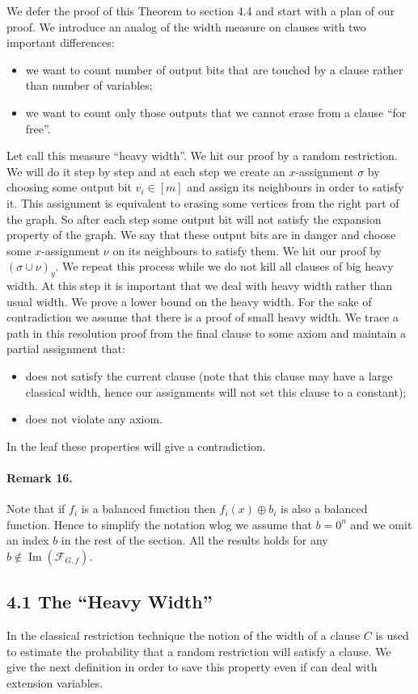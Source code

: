 \documentclass[10pt,a4paper]{article}
\begin{document}
We defer the proof of this Theorem to section 4.4 and start with a plan of our proof.
We introduce an analog of the width measure on clauses with two important differences:
\begin{itemize}
\item we want to count number of output bits that are touched by a clause rather than number of variables;
\item we want to count only those outputs that we cannot erase from a clause ``for free''.
\end{itemize}
Let call this measure ``heavy width''.
We hit our proof by a random restriction. We will do it step by step and at each step we create an $x$-assignment $\sigma$ by choosing some output bit $v_i\in[m]$ and assign its neighbours in order to satisfy it. This assignment is equivalent to erasing some vertices from the right part of the graph. So after each step some output bit will not satisfy the expansion property of the graph. We say that these output bits are in danger and choose some $x$-assignment $\nu$ on its neighbours to satisfy them. We hit our proof by $(\sigma\cup\nu)_y$.
We repeat this process while we do not kill all clauses of big heavy width. At this step it is important that we deal with heavy width rather than usual width.
We prove a lower bound on the heavy width. For the sake of contradiction we assume that there is a proof of small heavy width. We trace a path in this resolution proof from the final clause to some axiom and maintain a partial assignment that:
\begin{itemize}
\item does not satisfy the current clause (note that this clause may have a large classical width, hence our assignments will not set this clause to a constant);
\item does not violate any axiom.
\end{itemize}
In the leaf these properties will give a contradiction.
\paragraph{Remark 16.} Note that if $f_i$ is a balanced function then $f_i(x)\oplus b_i$ is also a balanced function. Hence to simplify the notation wlog we assume that $b=0^n$ and we omit an index $b$ in the rest of the section. All the results holds for any $b\notin\operatorname{Im}(\mathcal F_{G,f})$.

\subsection*{4.1 The ``Heavy Width''}
In the classical restriction technique the notion of the width of a clause $C$ is used to estimate the probability that a random restriction will satisfy a clause. We give the next definition in order to save this property even if can deal with extension variables.
\end{document}
